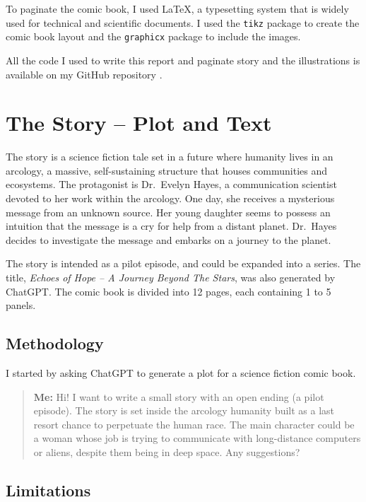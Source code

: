 \documentclass[a4paper,11pt]{article}
\begin{document}
To paginate the comic book, I used \LaTeX, a typesetting system that is widely used for technical and scientific documents. I used the \texttt{tikz} package to create the comic book layout and the \texttt{graphicx} package to include the images.

All the code I used to write this report and paginate story and the illustrations is available on my GitHub repository \cite{github}.



\section{The Story -- Plot and Text}

The story is a science fiction tale set in a future where humanity lives in an arcology, a massive, self-sustaining structure that houses communities and ecosystems. The protagonist is Dr.~Evelyn Hayes, a communication scientist devoted to her work within the arcology. One day, she receives a mysterious message from an unknown source. Her young daughter seems to possess an intuition that the message is a cry for help from a distant planet. Dr.~Hayes decides to investigate the message and embarks on a journey to the planet. 

The story is intended as a pilot episode, and could be expanded into a series. The title, \emph{Echoes of Hope -- A Journey Beyond The Stars}, was also generated by ChatGPT. The comic book is divided into 12 pages, each containing 1 to 5 panels.

\subsection*{Methodology} 
I started by asking ChatGPT to generate a plot for a science fiction comic book. 
\begin{quote}
    \textbf{Me:} Hi! I want to write a small story with an open ending (a pilot episode). The story is set inside the arcology humanity built as a last resort chance to perpetuate the human race. The main character could be a woman whose job is trying to communicate with long-distance computers or aliens, despite them being in deep space. Any suggestions?
\end{quote}

\subsection*{Limitations}
\end{document}
